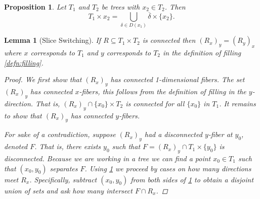 \documentclass{article}
\newcommand{\rxy}{(R_x)_y}
\theoremstyle{mystyle}
\newtheorem{lem}[thm]{Lemma}
\newtheorem{pro}[thm]{Proposition}
\theoremstyle{remark}
\begin{document}
\begin{pro}
\label{prop:directionunion}
Let $T_1$ and $T_2$ be trees with $x_2\in T_2$. Then $$T_1\times x_2 = \bigcup_{\delta \in D(x_1)} \overline{\delta}\times \{x_2\}.$$
\end{pro}

\begin{lem}
    [Slice Switching]
    \label{lem:sliceswitching}
    If \(R \subseteq T_{1} \times T_{2}\) is connected then \( \left( R_{x} \right)_{y} = \left( R_{y} \right)_{x}\) where $x$ corresponds to $T_1$ and $y$ corresponds to $T_2$ in the definition of filling \ref{defn:filling}.
    \begin{proof}
        We first show that $\rxy$ has connected 1-dimensional fibers. The set $\rxy$ has connected $x$-fibers, this follows from the definition of filling in the $y$-direction. That is, $\left( R_{x} \right)_{y} \cap \{x_0\} \times T_2$ is connected for all $\{x_0\}$ in $T_1$. It remains to show that \(\rxy\) has connected $y$-fibers.
        
        For sake of a contradiction, suppose \(\rxy\) had a disconnected $y$-fiber at $y_0$, denoted $F$. That is, there exists $y_0$ such that \(F = \left( R_{x} \right)_{y}\cap T_1 \times \{y_0\}\) is disconnected. Because we are working in a tree we can find a point \(x_0\in T_1\)  such that \((x_0,y_0)\)  separates \(F\). Using \ref{prop:directionunion} we proceed by cases on how many directions meet $R_x$. Specifically, subtract \((x_0,y_0)\) from both sides of \ref{prop:directionunion} to obtain a disjoint union of sets and ask how many intersect $F \cap R_x$.
        

\end{proof}
\end{lem}
\end{document}
